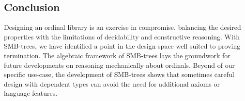\subsection{Conclusion}
Designing an ordinal library is an exercise in compromise, balancing the desired properties
with the limitations of decidability and constructive reasoning.
With SMB-trees, we have identified a point in the design space
well suited to proving termination. The algebraic framework of SMB-trees
lays the groundwork for future developments on reasoning mechanically
about ordinals. Beyond of our specific use-case, the development of
SMB-trees shows that sometimes careful design with dependent types
can avoid the need for additional axioms or language features.
